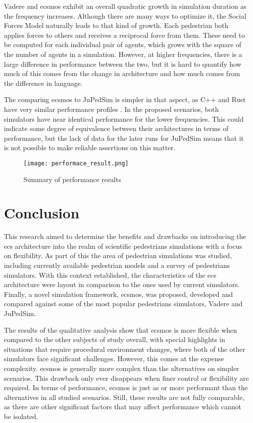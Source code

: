 \documentclass[twoside, 11pt]{article}
\begin{document}
Vadere and \gls{ecsmos} exhibit an overall quadratic growth in simulation duration as the frequency increases. Although there are many ways to optimize it, the Social Forces Model naturally leads to that kind of growth. Each pedestrian both applies forces to others and receives a reciprocal force from them. These need to be computed for each individual pair of agents, which grows with the square of the number of agents in a simulation. However, at higher frequencies, there is a large difference in performance between the two, but it is hard to quantify how much of this comes from the change in architecture and how much comes from the difference in language. 

The comparing \gls{ecsmos} to JuPedSim is simpler in that aspect, as C++ and Rust have very similar performance profiles \cite{electronics12010143}. In the proposed scenarios, both simulators have near identical performance for the lower frequencies. This could indicate some degree of equivalence between their architectures in terms of performance, but the lack of data for the later runs for JuPedSim means that it is not possible to make reliable assertions on this matter.

\begin{figure}
  \centering
  \texttt{[image: performace\_result.png]}
  \caption[Summary of performance results]{Summary of performance results}
  \label{fig:performace-results}
\end{figure}

\section{Conclusion} \label{sec:conclusion}

This research aimed to determine the benefits and drawbacks on introducing the \gls{ecs} architecture into the realm of scientific pedestrians simulations with a focus on flexibility. As part of this the area of pedestrian simulations was studied, including currently available pedestrian models and a survey of pedestrians simulators. With this context established, the characteristics of the \gls{ecs} architecture were layout in comparison to the ones used by current simulators. Finally, a novel simulation framework, \gls{ecsmos}, was proposed, developed and compared against some of the most popular pedestrians simulators, Vadere and JuPedSim.

The results of the qualitative analysis show that \gls{ecsmos} is more flexible when compared to the other subjects of study overall, with special highlights in situations that require procedural environment changes, where both of the other simulators face significant challenges. However, this comes at the expense complexity. \gls{ecsmos} is generally more complex than the alternatives on simpler scenarios. This drawback only ever disappears when finer control or flexibility are required. In terms of performance, \gls{ecsmos} is just as or more performant than the alternatives in all studied scenarios. Still, these results are not fully comparable, as there are other significant factors that may affect performance which cannot be isolated.
\end{document}
